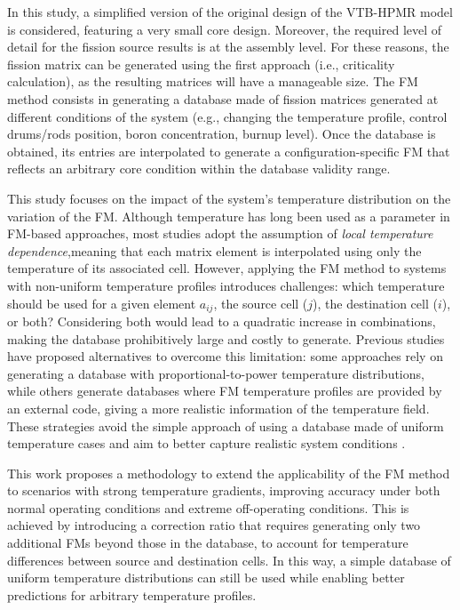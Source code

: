 \documentclass[letterpaper]{physor2026}
\begin{document}
In this study, a simplified version of the original design of the VTB-HPMR model is considered, featuring a very small core design. Moreover, the required level of detail for the fission source results is at the assembly level. For these reasons, the fission matrix can be generated using the first approach (i.e., criticality calculation), as the resulting matrices will have a manageable size.
The FM method consists in  generating a database made of fission matrices generated at different conditions of the system (e.g., changing the temperature profile, control drums/rods position, boron concentration, burnup level). Once the database is obtained, its entries are interpolated to generate a configuration-specific FM that reflects an arbitrary core condition within the database validity range.

This study focuses on the impact of the system's temperature distribution on the variation of the FM.
Although temperature has long been used as a parameter in FM-based approaches, most studies adopt the assumption of \textit{local temperature dependence},meaning that each matrix element is interpolated using only the temperature of its associated cell. 
However, applying the FM method to systems with non-uniform temperature profiles introduces challenges: which temperature should be used for a given element $a_{ij}$, the source cell ($j$), the destination cell ($i$), or both? Considering both would lead to a quadratic increase in combinations, making the database prohibitively large and costly to generate. 
Previous studies have proposed alternatives to overcome this limitation: some approaches rely on generating a database with proportional-to-power temperature distributions, while others generate databases where FM temperature profiles are provided by an external code, giving a more realistic information of the temperature field. These strategies avoid the simple approach of using a database made of uniform temperature cases and aim to better capture realistic system conditions \cite{Rau2021}.   

This work proposes a methodology to extend the applicability of the FM method to scenarios with strong temperature gradients, improving accuracy under both normal operating conditions and extreme off-operating conditions. This is achieved by introducing a correction ratio that requires generating only two additional FMs beyond those in the database, to account for temperature differences between source and destination cells. In this way, a simple database of uniform temperature distributions can still be used while enabling better predictions for arbitrary temperature profiles.
\end{document}
